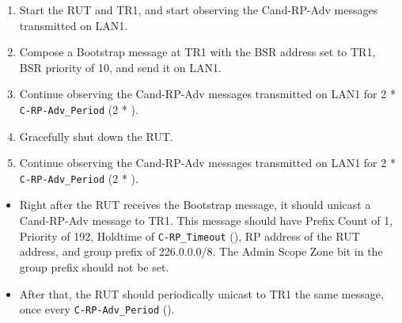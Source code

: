 \documentclass[11pt]{report}
\begin{document}

\begin{enumerate}

  \item Start the RUT and TR1, and start observing the Cand-RP-Adv messages
  transmitted on LAN1.

  \item Compose a Bootstrap message at TR1 with the BSR address set to TR1,
  BSR priority of 10, and send it on LAN1.

  \item Continue observing the Cand-RP-Adv messages transmitted on LAN1
  for 2 * \verb=C-RP-Adv_Period= (2 * {\PimsmCRPAdvPeriod}).

  \item Gracefully shut down the RUT.

  \item Continue observing the Cand-RP-Adv messages transmitted on LAN1
  for 2 * \verb=C-RP-Adv_Period= (2 * {\PimsmCRPAdvPeriod}).

\end{enumerate}



\begin{itemize}

  \item Right after the RUT receives the Bootstrap message, it should
  unicast a Cand-RP-Adv message to TR1. This message should have Prefix Count
  of 1, Priority of 192, Holdtime of \verb=C-RP_Timeout= ({\PimsmCRPTimeout}),
  RP address of the RUT address, and group prefix of 226.0.0.0/8. The Admin
  Scope Zone bit in the group prefix should not be set.

  \item After that, the RUT should periodically unicast to TR1 the same
  message, once every \verb=C-RP-Adv_Period= ({\PimsmCRPAdvPeriod}).

\end{itemize}

\end{document}

